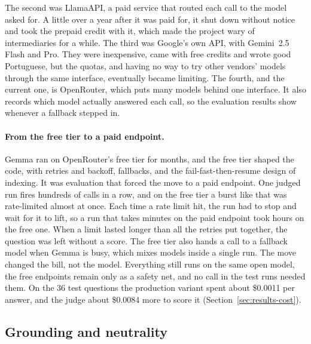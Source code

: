 The second was LlamaAPI, a paid service that routed each call to the model
asked for. A little over a year after it was paid for, it shut down without
notice and took the prepaid credit with it, which made the project wary of
intermediaries for a while. The third was Google's own API, with Gemini~2.5
Flash and Pro. They were inexpensive, came with free credits and wrote good
Portuguese, but the quotas, and having no way to try other vendors' models
through the same interface, eventually became limiting. The fourth, and the
current one, is OpenRouter, which puts many models behind one interface. It
also records which model actually answered each call, so the evaluation
results show whenever a fallback stepped in.

\paragraph{From the free tier to a paid endpoint.} Gemma ran on OpenRouter's
free tier for months, and the free tier shaped the code, with retries and
backoff, fallbacks, and the fail-fast-then-resume design of indexing. It was
evaluation that forced the move to a paid endpoint. One judged run fires
hundreds of calls in a row, and on the free tier a burst like that was
rate-limited almost at once. Each time a rate limit hit, the run had to stop
and wait for it to lift, so a run that takes minutes on the paid endpoint took
hours on the free one. When a limit lasted longer than all the retries put together, the
question was left without a score. The free tier also hands a call to a fallback model when
Gemma is busy, which mixes models inside a single run. The move changed the
bill, not the model. Everything still runs on the same open model, the free
endpoints remain only as a safety net, and no call in the test runs needed
them. On the 36 test questions the production variant spent about \$0.0011 per
answer, and the judge about \$0.0084 more to score it
(Section~\ref{sec:results-cost}).

\subsection{Grounding and neutrality} \label{subsec:grounding}

